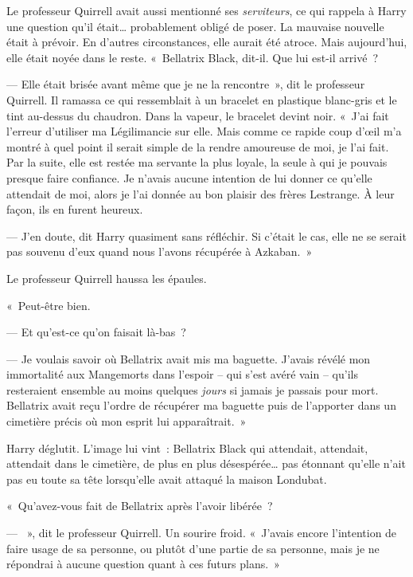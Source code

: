 Le professeur Quirrell avait aussi mentionné ses \emph{serviteurs}, ce qui rappela à Harry une question qu'il était… probablement obligé de poser. La mauvaise nouvelle était à prévoir. En d'autres circonstances, elle aurait été atroce. Mais aujourd'hui, elle était noyée dans le reste. «~Bellatrix Black, dit-il. Que lui est-il arrivé~?

--- Elle était brisée avant même que je ne la rencontre~», dit le professeur Quirrell. Il ramassa ce qui ressemblait à un bracelet en plastique blanc-gris et le tint au-dessus du chaudron. Dans la vapeur, le bracelet devint noir. «~J'ai fait l'erreur d'utiliser ma Légilimancie sur elle. Mais comme ce rapide coup d'œil m'a montré à quel point il serait simple de la rendre amoureuse de moi, je l'ai fait. Par la suite, elle est restée ma servante la plus loyale, la seule à qui je pouvais presque faire confiance. Je n'avais aucune intention de lui donner ce qu'elle attendait de moi, alors je l'ai donnée au bon plaisir des frères Lestrange. À leur façon, ils en furent heureux.

--- J'en doute, dit Harry quasiment sans réfléchir. Si c'était le cas, elle ne se serait pas souvenu d'eux quand nous l'avons récupérée à Azkaban.~»

Le professeur Quirrell haussa les épaules.

«~Peut-être bien.

--- Et qu'est-ce qu'on faisait là-bas~?

--- Je voulais savoir où Bellatrix avait mis ma baguette. J'avais révélé mon immortalité aux Mangemorts dans l'espoir -- qui s'est avéré vain -- qu'ils resteraient ensemble au moins quelques \emph{jours} si jamais je passais pour mort. Bellatrix avait reçu l'ordre de récupérer ma baguette puis de l'apporter dans un cimetière précis où mon esprit lui apparaîtrait.~»

Harry déglutit. L'image lui vint~: Bellatrix Black qui attendait, attendait, attendait dans le cimetière, de plus en plus désespérée… pas étonnant qu'elle n'ait pas eu toute sa tête lorsqu'elle avait attaqué la maison Londubat.

«~Qu'avez-vous fait de Bellatrix après l'avoir libérée~?

--- ~», dit le professeur Quirrell. Un sourire froid. «~J'avais encore l'intention de faire usage de sa personne, ou plutôt d'une partie de sa personne, mais je ne répondrai à aucune question quant à ces futurs plans.~»

